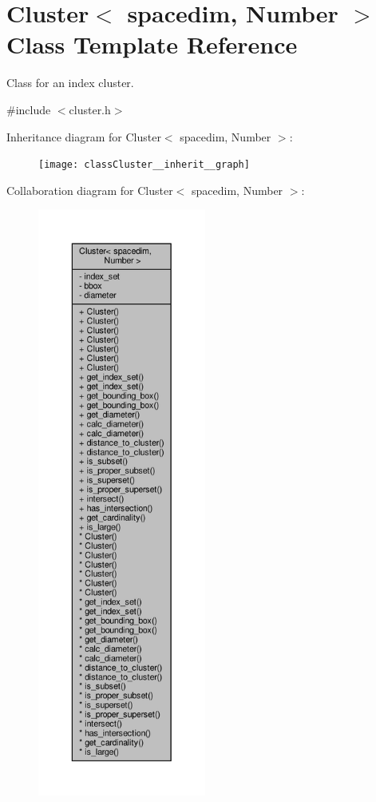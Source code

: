 \hypertarget{classCluster}{}\section{Cluster$<$ spacedim, Number $>$ Class Template Reference}
\label{classCluster}


Class for an index cluster.  




{\ttfamily \#include $<$cluster.\+h$>$}



Inheritance diagram for Cluster$<$ spacedim, Number $>$\+:\nopagebreak
\begin{figure}[H]
\begin{center}
\leavevmode
\texttt{[image: classCluster\_\_inherit\_\_graph]}
\end{center}
\end{figure}


Collaboration diagram for Cluster$<$ spacedim, Number $>$\+:\nopagebreak
\begin{figure}[H]
\begin{center}
\leavevmode
\includegraphics[height=550pt]{classCluster__coll__graph}
\end{center}
\end{figure}
